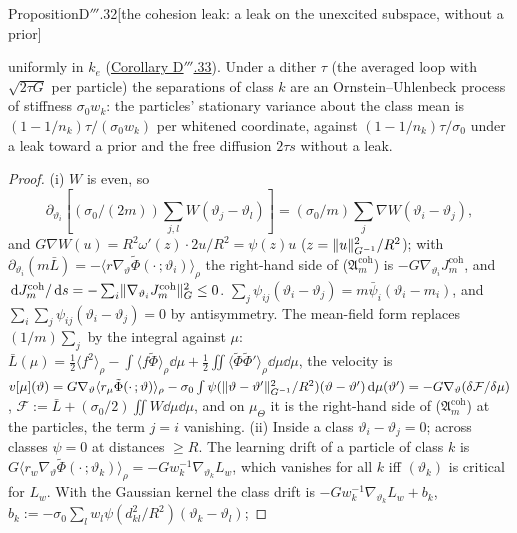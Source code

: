 \begin{thm}{Proposition}{D$'''$.32}[the cohesion leak: a leak on the unexcited subspace, without a
prior]
\begin{enumerate}[label=\textup{(\roman*)}]
    uniformly in $k_e$ (\hyperref[res:thmDppp:33]{Corollary D$'''$.33}). Under a dither $\tau$ (the averaged loop
    with $\sqrt{2\tau G}$ per particle) the separations of class $k$ are an Ornstein--Uhlenbeck process of stiffness
    $\sigma_0w_k$: the particles' stationary variance about the class mean is $(1 - 1/n_k)\tau/(\sigma_0w_k)$ per
    whitened coordinate, against $(1 - 1/n_k)\tau/\sigma_0$ under a leak toward a prior and the free diffusion
    $2\tau s$ without a leak.
\end{enumerate}
\end{thm}

\begin{proof}
(i) $W$ is even, so
\[
  \partial_{\vartheta_i}[(\sigma_0/(2m))\sum_{j,l}W(\vartheta_j - \vartheta_l)]
  = (\sigma_0/m)\sum_j\nabla W(\vartheta_i - \vartheta_j),
\]
and $G\nabla W(u) = R^2\omega'(z)\cdot2u/R^2 = \psi(z)u$ ($z = \lVert u\rVert^2_{G^{-1}}/R^2$); with
$\partial_{\vartheta_i}(m\bar L) = -\langle r\nabla_\vartheta\tilde\Phi(\cdot\,;\vartheta_i)\rangle_\rho$ the
right-hand side of \textup{($\mathfrak{A}_m^{\mathrm{coh}}$)} is $-G\nabla_{\vartheta_i}J^{\mathrm{coh}}_m$, and
$\,\mathrm{d} J^{\mathrm{coh}}_m/\,\mathrm{d} s = -\sum_i\lVert \nabla_{\vartheta_i}J^{\mathrm{coh}}_m\rVert^2_G\le0$.
$\sum_j\psi_{ij}(\vartheta_i - \vartheta_j) = m\bar\psi_i(\vartheta_i - m_i)$, and
$\sum_i\sum_j\psi_{ij}(\vartheta_i - \vartheta_j) = 0$ by antisymmetry. The mean-field form replaces $(1/m)\sum_j$ by
the integral against $\mu$: $\bar L(\mu) = \frac12\langle f^2\rangle_\rho - \int\langle f\tilde\Phi\rangle_\rho\dd\mu
+ \frac12\iint\langle\tilde\Phi\tilde\Phi'\rangle_\rho\dd\mu\dd\mu$, the velocity is
$v[\mu](\vartheta) = G\nabla_\vartheta\langle r_\mu\tilde\Phi(\cdot\,;\vartheta)\rangle_\rho
- \sigma_0\int\psi(\lVert \vartheta - \vartheta'\rVert^2_{G^{-1}}/R^2)(\vartheta - \vartheta')\,\mathrm{d}\mu(\vartheta')
= -G\nabla_\vartheta(\delta\mathcal{F}/\delta\mu)$, $\mathcal{F} := \bar L + (\sigma_0/2)\iint W\dd\mu\dd\mu$, and on
$\mu_\Theta$ it is the right-hand side of \textup{($\mathfrak{A}_m^{\mathrm{coh}}$)} at the particles, the term
$j = i$ vanishing. (ii) Inside a class $\vartheta_i - \vartheta_j = 0$; across classes $\psi = 0$ at distances
$\ge R$. The learning drift of a particle of class $k$ is
$G\langle r_w\nabla_\vartheta\tilde\Phi(\cdot\,;\vartheta_k)\rangle_\rho = -Gw_k^{-1}\nabla_{\vartheta_k}L_w$, which
vanishes for all $k$ iff $(\vartheta_k)$ is critical for $L_w$. With the Gaussian kernel the class drift is
$-Gw_k^{-1}\nabla_{\vartheta_k}L_w + b_k$, $b_k := -\sigma_0\sum_lw_l\psi(d^2_{kl}/R^2)(\vartheta_k - \vartheta_l)$;

\end{proof}
